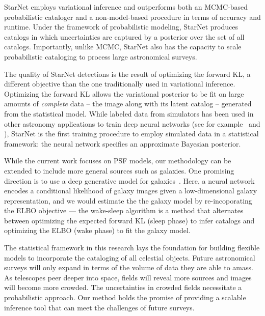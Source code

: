 StarNet employs variational inference and outperforms both an MCMC-based probabilistic cataloger and a non-model-based
procedure in terms of accuracy and runtime.
Under the framework of probabilistic modeling,
StarNet produces catalogs in which uncertainties are captured by a posterior over the set of all catalogs.
Importantly, unlike MCMC, StarNet also has the capacity to scale probabilistic cataloging to process large astronomical surveys.

The quality of StarNet detections is the result of optimizing the forward KL, a different objective than the one traditionally used in variational inference.
Optimizing the forward KL allows the variational posterior to be fit on large amounts of {\itshape complete} data -- the image along with its latent catalog -- generated from the statistical model.
While labeled data from simulators has been used in other astronomy applications to train deep neural networks (see for example~\cite{Lanusse_2017_cmudeeplens} and \cite{huang2019finding}), StarNet is the first training procedure to employ simulated data in a statistical framework: the neural network specifies an approximate Bayesian posterior.

While the current work focuses on PSF models, our methodology can be extended to
include more general sources such as galaxies.
One promising direction is to use a deep generative model for galaxies~\citep{Regier2015ADG, Reiman_2019_gans_deblend, lanusse2020deep, Arcelin_2020}.
Here, a neural network encodes a conditional likelihood of galaxy images given a low-dimensional galaxy representation,
and we would estimate the the galaxy model by re-incoporating the ELBO objective ---
the wake-sleep algorithm is a method that alternates between optimizing
the expected forward KL (sleep phase) to
infer catalogs and optimizing the ELBO (wake phase) to fit the galaxy model.

The statistical framework in this research lays the foundation for building flexible models to incorporate the cataloging of all celestial objects.
Future astronomical surveys will only expand in terms of the volume of data they are able to amass.
As telescopes peer deeper into space, fields will reveal more sources and images will become more crowded.
The uncertainties in crowded fields necessitate a probabilistic approach.
Our method holds the promise of providing  a scalable inference tool that can meet the challenges of future surveys.
